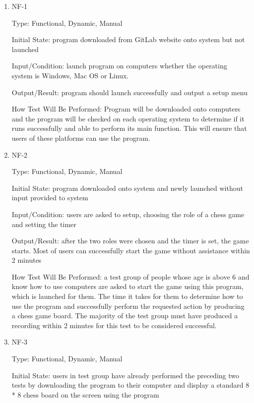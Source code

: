 \documentclass[12pt, titlepage]{article}
\begin{document}
\begin{enumerate}

\item{NF-1\\}

Type: Functional, Dynamic, Manual

Initial State: program downloaded from GitLab website onto system but not launched

Input/Condition: launch program on computers whether the operating system is Windows, Mac OS or Linux.

Output/Result: program should launch successfully and output a setup menu

How Test Will Be Performed: Program will be downloaded onto computers and the program will be checked on each operating system to determine if it runs successfully and able to perform its main function. This will ensure that users of these platforms can use the program.

\item{NF-2\\}

Type: Functional, Dynamic, Manual

Initial State: program downloaded onto system and newly launched without input provided to system

Input/Condition: users are asked to setup, choosing the role of a chess game and setting the timer 

Output/Result: after the two roles were chosen and the timer is set, the game starts. Most of users can successfully start the game without assistance within 2 minutes

How Test Will Be Performed: a test group of people whose age is above 6 and know how to use computers are asked to start the game using this program, which is launched for them. The time it takes for them to determine how to use the program and successfully perform the requested action by producing a chess game board. The majority of the test group must have produced a recording within 2 minutes for this test to be considered successful.

\item{NF-3\\}

Type: Functional, Dynamic, Manual

Initial State: users in test group have already performed the preceding two tests by downloading the program to their computer and display a standard 8 * 8 chess board on the screen using the program


\end{enumerate}
\end{document}
